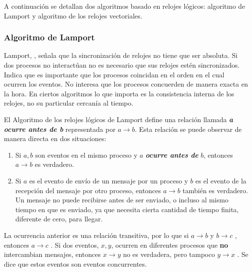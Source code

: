 			A continuaci\'on se detallan dos algoritmos basado en relojes l\'ogicos: algoritmo de Lamport y algoritmo de los relojes vectoriales.
		 
			\subsubsection{Algoritmo de Lamport}	
			 
				 
			Lamport,    ,  señala que la sincronización de relojes no tiene que ser absoluta. Si dos procesos no interactúan no es necesario que sus relojes estén sincronizados. 
			Indica que es importante que  los procesos coincidan en el orden en el cual ocurren los eventos. No interesa  que los procesos  concuerden de manera exacta en la hora.
			En ciertos  algoritmos lo que  importa es la consistencia interna de los relojes, no su particular cercanía al tiempo.
				 
			
			El Algoritmo de los relojes l\'ogicos de Lamport  define una relación llamada \textit{\textbf{a ocurre antes de b}}  representada por  $a \rightarrow b$. Esta relación se puede observar de manera directa en dos situaciones:
				\begin{enumerate}
					\item Si $a,  b$  son eventos en el mismo proceso y $ a$ \textbf{\textit{ocurre antes de}} $b$, entonces  $ a \rightarrow b $ es verdadero.
					\item Si $a$ es el evento de envío de un mensaje por un proceso y $b$ es el evento de la recepción del mensaje por otro proceso, entonces  $ a \rightarrow b $ también es verdadero. Un mensaje no puede recibirse antes de ser enviado, o incluso al mismo tiempo en que es enviado, ya 	que necesita cierta cantidad de tiempo finita, diferente de cero, para llegar.
						\end{enumerate} 
						
					 
			  La ocurrencia anterior es una relación transitiva, por lo que si   $ a \rightarrow b $  y   $ b \rightarrow c $ , entonces  $ a \rightarrow c $ .
				  Si dos eventos, $x,  y$, ocurren en diferentes procesos que \textbf{no} intercambian mensajes, entonces  $ x \rightarrow y $  no es verdadera, pero tampoco  $ y \rightarrow x $ .
			Se dice que estos eventos son  \gls{eventos concurrentes}.
			
